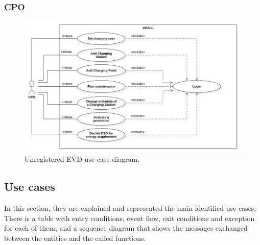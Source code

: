 \subsubsection*{CPO}
\begin{figure} [H]
    \begin{center}
        \includegraphics[width=0.9\linewidth]{Images/UseCaseDiagrams/CPO_use_case_diagram}
        \caption{Unregistered EVD use case diagram.}
        \label{fig: cpo_diag}
    \end{center}
\end{figure}

\subsection{Use cases}
\label{subsec: use_cases}%
\setcounter{uc}{1}
\newcommand{\cuc}{\theuc\stepcounter{uc}}
In this section, they are explained and represented the main identified use cases.
There is a table with entry conditions, event flow, exit conditions and exception for each of them, and a sequence diagram
that shows the messages exchanged between the entities and the called functions. \\
